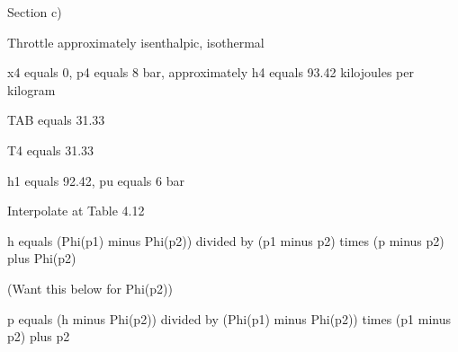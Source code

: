 Section c)

Throttle approximately isenthalpic, isothermal

x4 equals 0, p4 equals 8 bar, approximately h4 equals 93.42 kilojoules per kilogram

TAB equals 31.33

T4 equals 31.33

h1 equals 92.42, pu equals 6 bar

Interpolate at Table 4.12

h equals (Phi(p1) minus Phi(p2)) divided by (p1 minus p2) times (p minus p2) plus Phi(p2)

(Want this below for Phi(p2))

p equals (h minus Phi(p2)) divided by (Phi(p1) minus Phi(p2)) times (p1 minus p2) plus p2